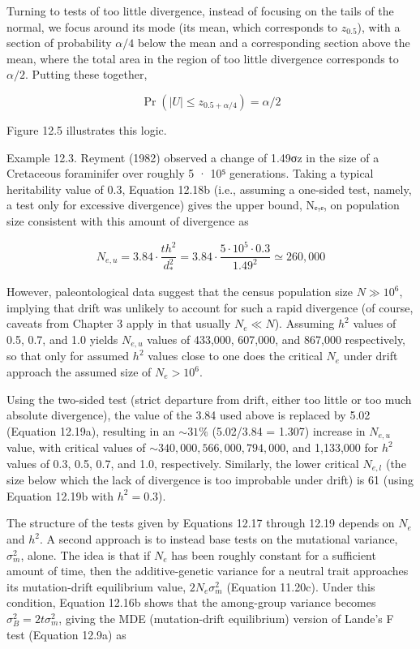 \documentclass{article}
\begin{document}
Turning to tests of too little divergence, instead of focusing on the tails of the normal, we focus around its mode (its mean, which corresponds to  $ z_{0.5} $), with a section of probability  $ \alpha/4 $ below the mean and a corresponding section above the mean, where the total area in the region of too little divergence corresponds to  $ \alpha/2 $. Putting these together,

\begin{equation}
\Pr\left(|U|\leq z_{0.5+\alpha/4}\right)=\alpha/2
\end{equation}

Figure 12.5 illustrates this logic.

Example 12.3. Reyment (1982) observed a change of 1.49σz in the size of a Cretaceous foraminifer over roughly 5 · 10⁵ generations. Taking a typical heritability value of 0.3, Equation 12.18b (i.e., assuming a one-sided test, namely, a test only for excessive divergence) gives the upper bound, Nₑ,ₑ, on population size consistent with this amount of divergence as

\begin{equation}
N_{e,u}=3.84\cdot\frac{t h^{2}}{d_{*}^{2}}=3.84\cdot\frac{5\cdot10^{5}\cdot0.3}{1.49^{2}}\simeq260,000
\end{equation}

However, paleontological data suggest that the census population size  $ N \gg 10^6 $, implying that drift was unlikely to account for such a rapid divergence (of course, caveats from Chapter 3 apply in that usually  $ N_e \ll N $). Assuming  $ h^2 $ values of 0.5, 0.7, and 1.0 yields  $ N_{e,u} $ values of 433,000, 607,000, and 867,000 respectively, so that only for assumed  $ h^2 $ values close to one does the critical  $ N_e $ under drift approach the assumed size of  $ N_e > 10^6 $.

Using the two-sided test (strict departure from drift, either too little or too much absolute divergence), the value of the 3.84 used above is replaced by 5.02 (Equation 12.19a), resulting in an  $ \sim31\% $ (5.02/3.84 = 1.307) increase in  $ N_{e,u} $ value, with critical values of  $ \sim340,000,566,000,794,000 $, and 1,133,000 for  $ h^{2} $ values of 0.3, 0.5, 0.7, and 1.0, respectively. Similarly, the lower critical  $ N_{e,l} $ (the size below which the lack of divergence is too improbable under drift) is 61 (using Equation 12.19b with  $ h^{2} = 0.3 $).

The structure of the tests given by Equations 12.17 through 12.19 depends on  $ N_e $ and  $ h^2 $. A second approach is to instead base tests on the mutational variance,  $ \sigma_m^2 $, alone. The idea is that if  $ N_e $ has been roughly constant for a sufficient amount of time, then the additive-genetic variance for a neutral trait approaches its mutation-drift equilibrium value,  $ 2N_e\sigma_m^2 $ (Equation 11.20c). Under this condition, Equation 12.16b shows that the among-group variance becomes  $ \sigma_B^2 = 2t\sigma_m^2 $, giving the MDE (mutation-drift equilibrium) version of Lande's F test (Equation 12.9a) as
\end{document}
